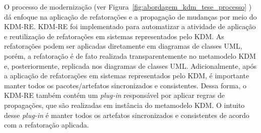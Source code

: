 
O processo de modernização (ver Figura~\ref{fig:abordagem_kdm_tese_processo} ) dá enfoque na aplicação de refatorações e a propagação de mudanças por meio do KDM-RE. KDM-RE foi implementado para automatizar a atividade de aplicação e reutilização de refatorações em sistemas representados pelo KDM. As refatorações podem ser aplicadas diretamente em diagramas de classes UML, porém, a refatoração é de fato realizada transparentemente no metamodelo KDM e, posteriormente, replicada nos diagramas de classes UML. Adicionalmente, após a aplicação de refatorações em sistemas representados pelo KDM, é importante manter todos os pacotes/artefatos sincronizados e consistentes. Dessa forma, o KDM-RE também contém um \textit{plug-in} responsável por aplicar regras de propagações, que são realizadas em instância do metamodelo KDM. O intuito desse \textit{plug-in} é manter todos os artefatos sincronizados e consistentes de acordo com a refatoração aplicada.









	
	

